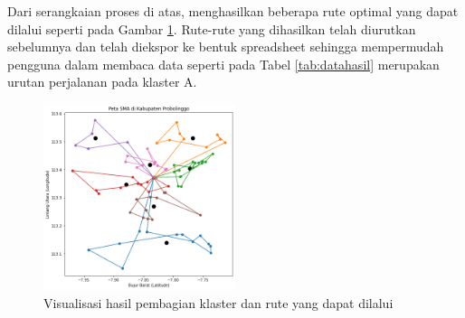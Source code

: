 Dari serangkaian proses di atas, menghasilkan beberapa rute optimal yang dapat dilalui seperti pada Gambar \ref{fig:vishasilmtsp}. Rute-rute yang dihasilkan telah diurutkan sebelumnya dan telah diekspor ke bentuk spreadsheet sehingga mempermudah pengguna dalam membaca data seperti pada Tabel \ref{tab:datahasil} merupakan urutan perjalanan pada klaster A.

\begin{figure}[h!]
	\centering
	\includegraphics[width=0.5\textwidth]{hasil mtsp.png}
	\caption{Visualisasi hasil pembagian klaster dan rute yang dapat dilalui}
	\label{fig:vishasilmtsp}
\end{figure}

